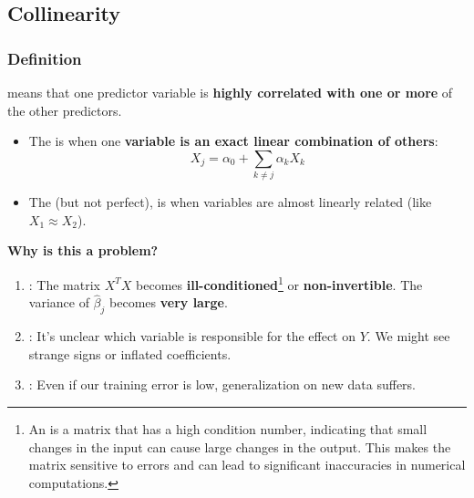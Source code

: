 \subsection{Collinearity}

\subsubsection{Definition}

 means that one predictor variable is \textbf{highly correlated with one or more} of the other predictors.
\begin{itemize}
    \item The  is when one \textbf{variable is an exact linear combination of others}:
    \begin{equation}
        X_{j} = \alpha_{0} + \displaystyle\sum_{k \ne j} \alpha_{k} X_{k}
    \end{equation}

    \item The  (but not perfect), is when variables are almost linearly related (like $X_1 \approx X_2$).
\end{itemize}

\highspace
\begin{flushleft}
    \textcolor{Red2}{ \textbf{Why is this a problem?}}
\end{flushleft}
\begin{enumerate}
    \item {}: The matrix $X^TX$ becomes \textbf{ill-conditioned}\footnote{An  is a matrix that has a high condition number, indicating that small changes in the input can cause large changes in the output. This makes the matrix sensitive to errors and can lead to significant inaccuracies in numerical computations.} or \textbf{non-invertible}. The variance of $\hat{\beta}_j$ becomes \textbf{very large}.
    \item {}: It's unclear which variable is responsible for the effect on $Y$. We might see strange signs or inflated coefficients.
    \item {}: Even if our training error is low, generalization on new data suffers.
\end{enumerate}

